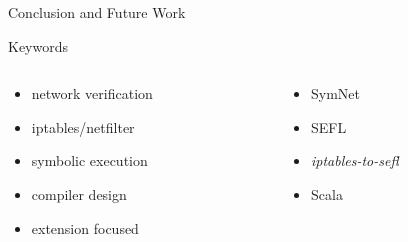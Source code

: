 \documentclass{beamer}
\begin{document}
\begin{frame}{Conclusion and Future Work}
\end{frame}

\begin{frame}{Keywords}
\begin{columns}
  \begin{column}{0.5\textwidth}
    \centering
    \begin{itemize}
      \item network verification
      \item iptables/netfilter
      \item symbolic execution
      \item compiler design
      \item extension focused
    \end{itemize}
  \end{column}
  \begin{column}{0.5\textwidth}
    \centering
    \begin{itemize}
      \item SymNet
      \item SEFL
      \item \emph{iptables-to-sefl}
      \item Scala
    \end{itemize}
  \end{column}
\end{columns}
\end{frame}
\end{document}
